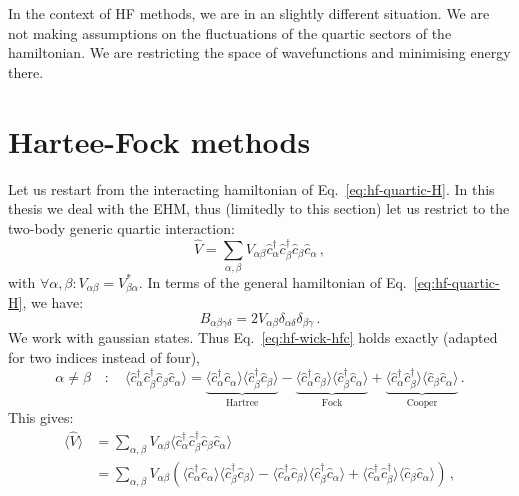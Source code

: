 In the context of HF methods, we are in an slightly different situation. We are not making assumptions on the fluctuations of the quartic sectors of the hamiltonian. We are restricting the space of wavefunctions and minimising energy there. 

\section{Hartee-Fock methods}

Let us restart from the interacting hamiltonian of Eq.~\eqref{eq:hf-quartic-H}. In this thesis we deal with the EHM, thus (limitedly to this section) let us restrict to the two-body generic quartic interaction:
\[
\hat V = \sum_{\alpha,\beta} V_{\alpha\beta} \hat c_\alpha^\dagger \hat c_\beta^\dagger \hat c_\beta \hat c_\alpha \, ,
\]
with $\forall \alpha, \beta \colon V_{\alpha\beta}=V_{\beta\alpha}^*$. In terms of the general hamiltonian of Eq.~\eqref{eq:hf-quartic-H}, we have:
\begin{equation}\label{appeq:mft-B=2V}
	B_{\alpha\beta\gamma\delta} = 2V_{\alpha\beta} \delta_{\alpha\delta} \delta_{\beta\gamma} \, .
\end{equation}
We work with gaussian states. Thus Eq.~\eqref{eq:hf-wick-hfc} holds exactly (adapted for two indices instead of four),
\[
\alpha \neq \beta
\quad\colon\quad
\langle
\hat c_\alpha^\dagger \hat c_\beta^\dagger \hat c_\beta \hat c_\alpha
\rangle = \underbrace{
	\langle 
	\hat c_\alpha^\dagger \hat c_\alpha
	\rangle \langle	
	\hat c_\beta^\dagger \hat c_\beta
	\rangle
}_{\text{Hartree}}
- 
\underbrace{
	\langle 
	\hat c_\alpha^\dagger \hat c_\beta
	\rangle \langle	
	\hat c_\beta^\dagger \hat c_\alpha 
	\rangle 
}_{\text{Fock}}
+ 
\underbrace{
	\langle 
	\hat c_\alpha^\dagger \hat c_\beta^\dagger
	\rangle \langle	
	\hat c_\beta \hat c_\alpha 
	\rangle 
}_{\text{Cooper}} \, .
\]
This gives:
\begin{align}
	\big\langle \hat V \big\rangle &= \sum_{\alpha,\beta} V_{\alpha\beta} \big\langle \hat c_\alpha^\dagger \hat c_\beta^\dagger \hat c_\beta \hat c_\alpha \big\rangle \nonumber \\
	&= \sum_{\alpha,\beta} V_{\alpha\beta} \left(
	\langle 
	\hat c_\alpha^\dagger \hat c_\alpha
	\rangle \langle	
	\hat c_\beta^\dagger \hat c_\beta
	\rangle - \langle 
	\hat c_\alpha^\dagger \hat c_\beta
	\rangle \langle	
	\hat c_\beta^\dagger \hat c_\alpha 
	\rangle + \langle 
	\hat c_\alpha^\dagger \hat c_\beta^\dagger
	\rangle \langle	
	\hat c_\beta \hat c_\alpha 
	\rangle 
	\right) \, , \label{appeq:mft-wick-EV} 
\end{align}
